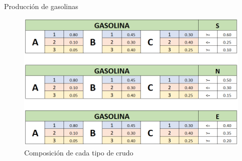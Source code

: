 \documentclass[../../main.tex]{subfiles}
\begin{document}
  

\begin{frame}{Producción de gasolinas}
        \begin{figure}[h]
      \centering
        \includegraphics[scale=0.40]{03_gasoline-production.png}
      \caption{\label{fig:components}Composición de cada tipo de crudo}      
    \end{figure}
  \end{frame}
\end{document}
